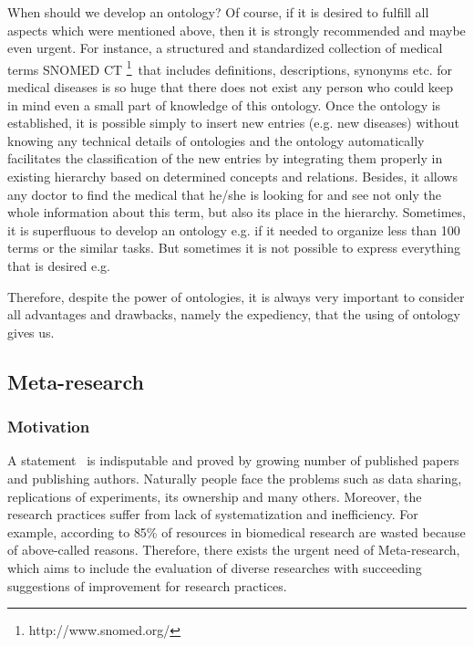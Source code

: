 		When should we develop an ontology? Of course, if it is desired to fulfill all aspects which were mentioned above, then it is strongly recommended and maybe even urgent. For instance, a structured and standardized collection of medical terms SNOMED CT \footnote{http://www.snomed.org/}\ that includes definitions, descriptions, synonyms etc. for medical diseases is so huge that there does not exist any person who could keep in mind even a small part of knowledge of this ontology. Once the ontology is established, it is possible simply to insert new entries (e.g. new diseases) without knowing any technical details of ontologies and the ontology automatically facilitates the classification of the new entries by integrating them properly in existing hierarchy based on determined concepts and relations. Besides, it allows any doctor to find the medical that he/she is looking for and see not only the whole information about this term, but also its place in the hierarchy. 
		Sometimes, it is superfluous to develop an ontology e.g. if it needed to organize less than 100 terms or the similar tasks. But sometimes it is not possible to express everything that is desired e.g. \frqq\cite[p. 88]{Fre12}        
		
		Therefore, despite the power of ontologies, it is always very important to consider all advantages and drawbacks, namely the expediency, that the using of ontology gives us.  
	\subsection{Meta-research}
		\subsubsection{Motivation}
		A statement \frqq \ is indisputable and proved by growing number of published papers and publishing authors\cite{Ioa14}. Naturally people face the problems such as data sharing, replications of experiments, its ownership and many others. Moreover, the research practices suffer from lack of systematization and inefficiency. For example, according to \cite{Mac14}  85\% of resources in biomedical research are wasted because of above-called reasons. Therefore, there exists the urgent need of Meta-research, which aims to include the evaluation of diverse researches with succeeding suggestions of improvement for research practices.    
		

